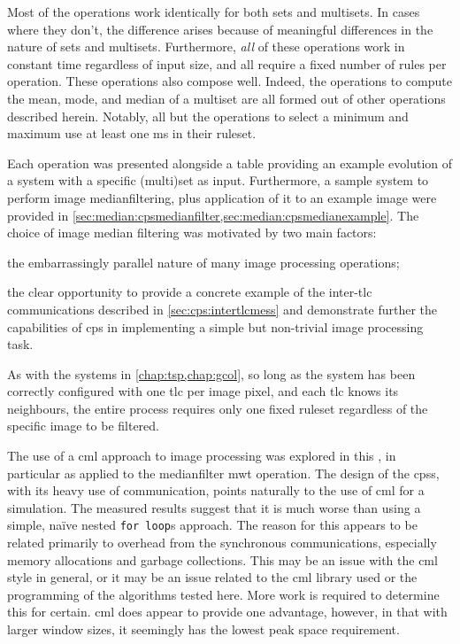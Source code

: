 Most of the operations work identically for both sets and multisets.  In cases where they don't, the difference arises because of meaningful differences in the nature of sets and multisets.  Furthermore, \emph{all} of these operations work in constant time regardless of input size, and all require a fixed number of rules per operation.  These operations also compose well.  Indeed, the operations to compute the mean, mode, and median of a multiset are all formed out of other operations described herein.  Notably, all but the operations to select a minimum and maximum use at least one \gls{ms} in their ruleset.

Each operation was presented alongside a table providing an example evolution of a system with a specific (multi)set as input.  Furthermore, a sample system to perform image \gls{medianfilter}ing, plus application of it to an example image were provided in \cref{sec:median:cpsmedianfilter,sec:median:cpsmedianexample}.  The choice of image median filtering was motivated by two main factors:
\begin{inparaenum}[(i)]
\item the embarrassingly parallel nature of many image processing operations;
\item the clear opportunity to provide a concrete example of the inter-\gls{tlc} communications described in \cref{sec:cps:intertlcmess} and demonstrate further the capabilities of \gls{cps} in implementing a simple but non-trivial image processing task.
\end{inparaenum}
As with the systems in \cref{chap:tsp,chap:gcol}, so long as the system has been correctly configured with one \gls{tlc} per image pixel, and each \gls{tlc} knows its neighbours, the entire process requires only one fixed ruleset regardless of the specific image to be filtered.

The use of a \gls{cml} approach to image processing was explored in this , in particular as applied to the \gls{medianfilter} \gls{mwt} operation.  The design of the \glspl{cps}, with its heavy use of communication, points naturally to the use of \gls{cml} for a simulation.  The measured results suggest that it is much worse than using a simple, naïve nested \texttt{for loop}s approach.  The reason for this appears to be related primarily to overhead from the synchronous communications, especially memory allocations and garbage collections.  This may be an issue with the \gls{cml} style in general, or it may be an issue related to the \gls{cml} library used or the programming of the algorithms tested here.  More work is required to determine this for certain.  \Gls{cml} does appear to provide one advantage, however, in that with larger window sizes, it seemingly has the lowest peak space requirement.

